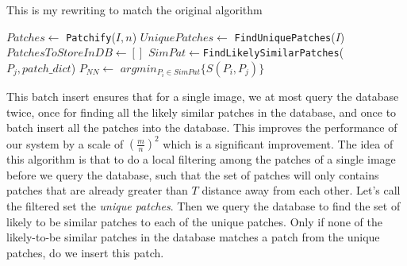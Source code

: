 \begin{algorithm}
    \caption{This is my rewriting to match the original algorithm}
    \label{alg:insert}
\begin{algorithmic}[1]
\State $Patches \leftarrow $ \texttt{Patchify}($I, n$)
\State $UniquePatches \leftarrow$ \texttt{FindUniquePatches}($I$)
\State $PatchesToStoreInDB \leftarrow []$
\State $SimPat \leftarrow $\texttt{FindLikelySimilarPatches}($P_j,patch\_dict$)
\State $P_{NN} \leftarrow $ $argmin_{P_i \in SimPat} \{ S(P_i, P_j) \}$
\EndIf
\EndFor
{}
\vspace{3mm}
\end{algorithmic}
\label{opt_algorithm}
\end{algorithm}

This batch insert ensures that for a single image, we at most query the database twice, once for finding all the likely similar patches in the database, and once to batch insert all the patches into the database. This improves the performance of our system by a scale of $\left(\frac{m}{n}\right)^2$ which is a significant improvement. 
The idea of this algorithm is that to do a local filtering among the patches of a single image before we query the database, such that the set of patches will only contains patches that are already greater than $T$ distance away from each other.  Let's call the filtered set the \emph{unique patches}. Then we query the database to find the set of likely to be similar patches to each of the unique patches. Only if none of the likely-to-be similar patches in the database matches a patch from the unique patches, do we insert this patch. 
